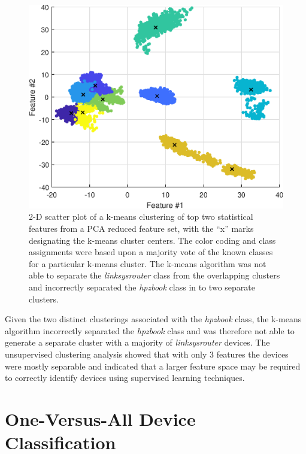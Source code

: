 \begin{figure}[tb]
	\includegraphics[width=\textwidth]{./dasp_algorithm_results/dasp_stat_cluster_kmeans.eps}
	\centering
	\caption{2-D scatter plot of a k-means clustering of top two statistical features from a PCA reduced feature set, with the ``x'' marks designating the k-means cluster centers.  The color coding and class assignments were based upon a majority vote of the known classes for a particular k-means cluster.  The k-means algorithm was not able to separate the \textit{linksysrouter} class from the overlapping clusters and incorrectly separated the \textit{hpzbook} class in to two separate clusters.}
	\label{fig:cluster_kmeans}
\end{figure}

Given the two distinct clusterings associated with the \textit{hpzbook} class, the k-means algorithm incorrectly separated the \textit{hpzbook} class and was therefore not able to generate a separate cluster with a majority of \textit{linksysrouter} devices.  The unsupervised clustering analysis showed that with only $3$ features the devices were mostly separable and indicated that a larger feature space may be required to correctly identify devices using supervised learning techniques.

\section[One-Versus-All Device Classification]{One-Versus-All Device Classification}
\label{Single Device Classification}

